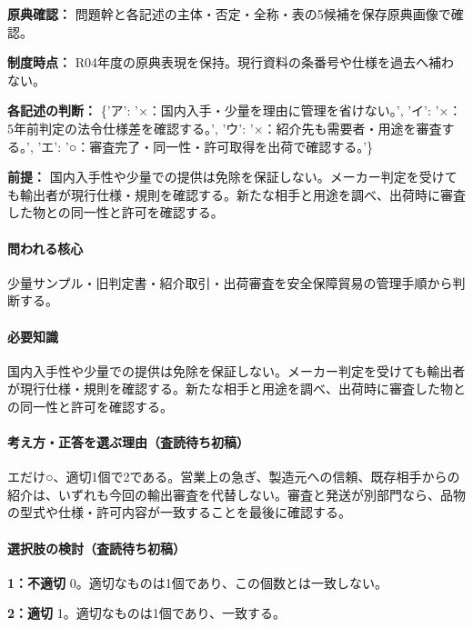 \noindent\textbf{原典確認：} 問題幹と各記述の主体・否定・全称・表の5候補を保存原典画像で確認。\par

\noindent\textbf{制度時点：} R04年度の原典表現を保持。現行資料の条番号や仕様を過去へ補わない。\par

\noindent\textbf{各記述の判断：} \{'ア': '×：国内入手・少量を理由に管理を省けない。', 'イ': '×：5年前判定の法令仕様差を確認する。', 'ウ': '×：紹介先も需要者・用途を審査する。', 'エ': '○：審査完了・同一性・許可取得を出荷で確認する。'\}\par

\noindent\textbf{前提：} 国内入手性や少量での提供は免除を保証しない。メーカー判定を受けても輸出者が現行仕様・規則を確認する。新たな相手と用途を調べ、出荷時に審査した物との同一性と許可を確認する。\par

\paragraph{問われる核心} 少量サンプル・旧判定書・紹介取引・出荷審査を安全保障貿易の管理手順から判断する。

\paragraph{必要知識} 国内入手性や少量での提供は免除を保証しない。メーカー判定を受けても輸出者が現行仕様・規則を確認する。新たな相手と用途を調べ、出荷時に審査した物との同一性と許可を確認する。

\paragraph{考え方・正答を選ぶ理由（査読待ち初稿）} エだけ○、適切1個で2である。営業上の急ぎ、製造元への信頼、既存相手からの紹介は、いずれも今回の輸出審査を代替しない。審査と発送が別部門なら、品物の型式や仕様・許可内容が一致することを最後に確認する。

\paragraph{選択肢の検討（査読待ち初稿）}\mbox{}\par

\noindent\textbf{1：不適切} 0。適切なものは1個であり、この個数とは一致しない。\par

\noindent\textbf{2：適切} 1。適切なものは1個であり、一致する。\par

